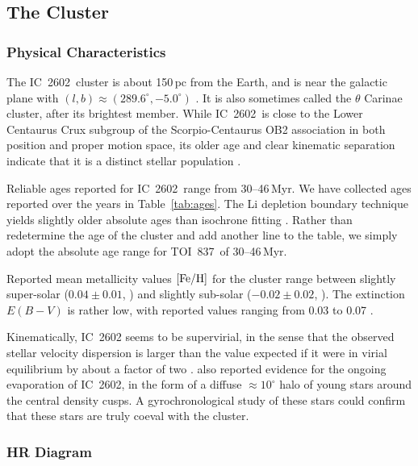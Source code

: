 \documentclass[12pt,twocolumn,tighten]{aastex63}
\newcommand{\tn}{TOI~837} %
\newcommand{\cn}{IC~2602} %
\begin{document}



\subsection{The Cluster}
\label{subsec:cluster}

\subsubsection{Physical Characteristics}
\label{subsec:clusterchar}

The \cn\ cluster is about 150$\,$pc from the Earth, and is near the
galactic plane with $(l,b)\approx(289.6^\circ, -5.0^\circ)$
\citep{cantatgaudin_gaia_2018}.  It is also sometimes called the
$\theta$ Carinae cluster, after its brightest member.  While \cn\ is
close to the Lower Centaurus Crux subgroup of the Scorpio-Centaurus
OB2 association in both position and proper motion space, its older
age and clear kinematic separation indicate that it is a distinct
stellar population
\citep{de_zeeuw_hipparcos_1999,damiani_stellar_2019}.

Reliable ages reported for \cn\ range from 30--46$\,$Myr.  We have
collected ages reported over the years in Table~\ref{tab:ages}.  The
Li depletion boundary technique yields slightly older absolute ages
than isochrone fitting \citep{dobbie_ic_2010,randich_gaiaeso_2018}.
Rather than redetermine the age of the cluster and add another line to
the table, we simply adopt the absolute age range for \tn\ of
30--46$\,$Myr.

Reported mean metallicity values ${\rm [Fe/H]}$ for the cluster range
between slightly super-solar ($0.04\pm0.01$,
\citealt{baratella_gaia-eso_2020}) and slightly sub-solar ($-0.02 \pm
0.02$, \citealt{netopil_metallicity_2016}).  The extinction $E(B-V)$
is rather low, with reported values ranging from 0.03 to 0.07
\citep[{\it e.g.},][]{randich_gaiaeso_2018}.

Kinematically, IC~2602 seems to be supervirial, in the sense that the
observed stellar velocity dispersion is larger than the value expected
if it were in virial equilibrium by about a factor of two
\citep{bravi_gaia-eso_2018}.  \citet{damiani_stellar_2019} also
reported evidence for the ongoing evaporation of \cn, in the form of a
diffuse $\approx10^\circ$ halo of young stars around the central
density cusps.  A gyrochronological study of these stars could confirm
that these stars are truly coeval with the cluster.

\subsubsection{HR Diagram}
\end{document}
